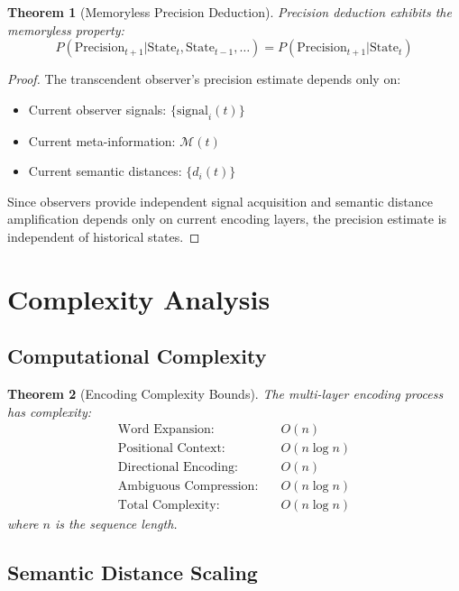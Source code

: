 \documentclass[12pt,a4paper]{article}
\newtheorem{theorem}{Theorem}
\begin{document}
\begin{theorem}[Memoryless Precision Deduction]
Precision deduction exhibits the memoryless property:
\begin{equation}
P(\text{Precision}_{t+1} | \text{State}_t, \text{State}_{t-1}, \ldots) = P(\text{Precision}_{t+1} | \text{State}_t)
\end{equation}
\end{theorem}

\begin{proof}
The transcendent observer's precision estimate depends only on:
\begin{itemize}
\item Current observer signals: $\{\text{signal}_i(t)\}$
\item Current meta-information: $\mathcal{M}(t)$
\item Current semantic distances: $\{d_i(t)\}$
\end{itemize}

Since observers provide independent signal acquisition and semantic distance amplification depends only on current encoding layers, the precision estimate is independent of historical states.
\end{proof}

\section{Complexity Analysis}

\subsection{Computational Complexity}

\begin{theorem}[Encoding Complexity Bounds]
The multi-layer encoding process has complexity:
\begin{align}
\text{Word Expansion}: &\quad O(n) \\
\text{Positional Context}: &\quad O(n \log n) \\
\text{Directional Encoding}: &\quad O(n) \\
\text{Ambiguous Compression}: &\quad O(n \log n) \\
\text{Total Complexity}: &\quad O(n \log n)
\end{align}
where $n$ is the sequence length.
\end{theorem}

\subsection{Semantic Distance Scaling}
\end{document}
